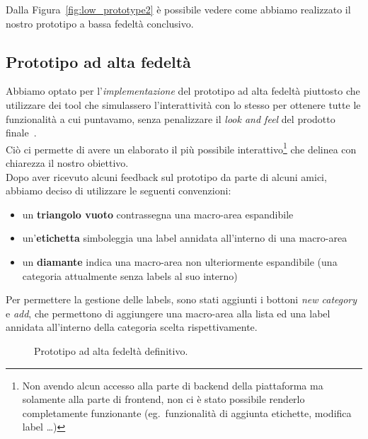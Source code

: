 \documentclass[12pt]{article} %
\begin{document}
Dalla Figura~\ref{fig:low_prototype2} \`e possibile vedere come abbiamo realizzato il nostro prototipo a bassa fedelt\`a conclusivo.\\

\subsection{Prototipo ad alta fedelt\`a}
Abbiamo optato per l'\emph{implementazione} del prototipo ad alta fedelt\`a piuttosto che utilizzare dei tool che simulassero l'interattivit\`a con lo stesso per ottenere tutte le funzionalit\`a a cui puntavamo, senza penalizzare il \emph{look and feel} del prodotto finale~\cite[p.~263]{InteractionDesign}.\\
Ci\`o ci permette di avere un elaborato il pi\`u possibile interattivo\footnote{Non avendo alcun accesso alla parte di backend della piattaforma ma solamente alla parte di frontend, non ci \`e stato possibile renderlo completamente funzionante (eg.\ funzionalit\`a di aggiunta etichette, modifica label \dots)} che delinea con chiarezza il nostro obiettivo.\\
Dopo aver ricevuto alcuni feedback sul prototipo da parte di alcuni amici, abbiamo deciso di utilizzare le seguenti convenzioni:
\begin{itemize}
\item un \textbf{triangolo vuoto} contrassegna una macro-area espandibile
\item un'\textbf{etichetta} simboleggia una label annidata all'interno di una macro-area
\item un \textbf{diamante} indica una macro-area non ulteriormente espandibile (una categoria attualmente senza labels al suo interno)
\end{itemize}
Per permettere la gestione delle labels, sono stati aggiunti i bottoni \emph{new category} e \emph{add}, che permettono di aggiungere una macro-area alla lista ed una label annidata all'interno della categoria scelta rispettivamente.

\begin{figure}[H]
\caption{Prototipo ad alta fedelt\`a definitivo.}
\label{fig:dopo}
\end{figure}
\end{document}
